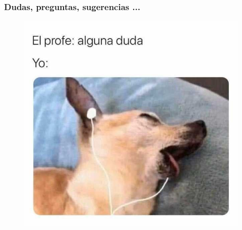 \documentclass[
	10pt, %
	aspectratio=169, %
]{beamer}
\begin{document}
\begin{frame}
	
	\frametitle{Dudas, preguntas, sugerencias ...}
	
	\begin{figure}[h]
		\centering
		\includegraphics[scale=0.38]{duda_1.jpg}
	\end{figure}
	
\end{frame}


	
	
		
		
		
		
	
\end{document}
